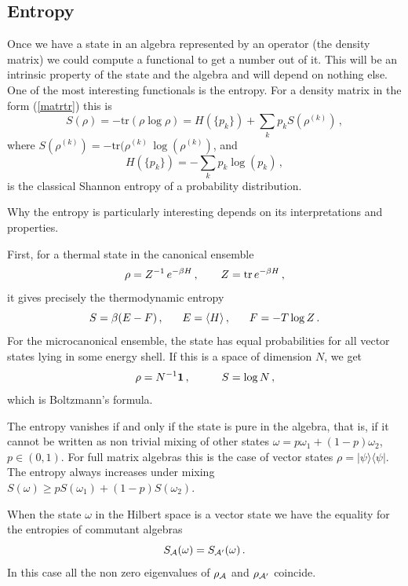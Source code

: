 \documentclass[11pt]{article}
\numberwithin{equation}{section}
\newcommand{\be}{\begin{equation}}
\newcommand{\ee}{\end{equation}}
\begin{document}
\subsection{Entropy}
Once we have a state in an algebra represented by an operator (the density matrix) we could compute a functional to get a number out of it. This will be an intrinsic property of the state and the algebra and will depend on nothing else. One of the most interesting functionals is the entropy. For a density matrix in the form (\ref{matrtr}) this is   
\begin{equation}
S(\rho)=-\textrm{tr}(\rho\log \rho)=H(\{p_k\})+\sum_k p_k S(\rho^{(k)})\,,
\end{equation}
where $S(\rho^{(k)})=-\textrm{tr}(\rho^{(k)} \, \log(\rho^{(k)})$, and
\begin{equation}
H(\{p_k\})=-\sum_k p_k \log(p_k)\,,
\end{equation}
is the classical Shannon entropy of a probability distribution. 

Why the entropy is particularly interesting depends on its interpretations and properties. 

First, for a thermal state in the canonical ensemble 
\be
\rho=Z^{-1}\, e^{-\beta H}\,,\hspace{.7cm} Z=\textrm{tr} \, e^{-\beta H}\,,
\ee
it gives precisely the thermodynamic entropy
\be 
S= \beta (E-F) \,,\hspace{.6cm} E= \langle H\rangle\,,\hspace{.6cm} F=-T \log Z\,.
\ee
For the microcanonical ensemble, the state has equal probabilities for all vector states lying in some energy shell. If this is a space of dimension $N$, we get
\be
\rho= N^{-1} {\bf 1}\,,\hspace{1cm} S=\log N\,,
\ee
which is Boltzmann's formula. 

The entropy vanishes if and only if the state is pure in the algebra, that is, if it cannot be written as non trivial mixing of other states $\omega= p \omega_1+(1-p) \omega_2$, $p\in (0,1)$. For full matrix algebras this is the case of vector states $\rho=|\psi\rangle \langle\psi|$. The entropy always increases under mixing $S(\omega)\ge  p S(\omega_1)+(1-p) S(\omega_2)$. 

When the state $\omega$ in the Hilbert space is a vector state we have the equality for the entropies of commutant algebras 
\begin{equation}
S_{{\cal A}}(\omega)=S_{{\cal A}'}(\omega)\,.
\end{equation}
In this case all the non zero eigenvalues of $\rho_{\cal A}$ and $\rho_{{\cal A}'}$ coincide.
\end{document}

